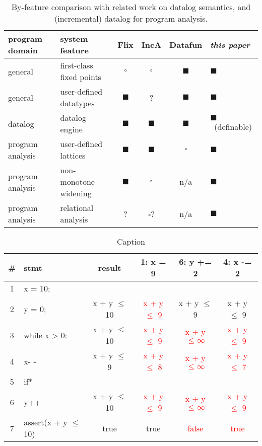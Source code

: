 \documentclass[acmlarge,anonymous]{acmart}\settopmatter{printfolios=true}
\begin{document}
\newcommand{\TabYes}{\ensuremath{\blacksquare}}
\newcommand{\TabNo}{\ensuremath{\square}}

\begin{table}
\begin{tabular}{|p{1.3in}p{1.5in}||ccc|l|}
  \hline
  \textbf{program domain} &
  \textbf{system feature} & Flix & IncA & Datafun & \emph{this paper}
  \\
  \hline
  general &
  first-class  
  fixed points & \TabNo & \TabNo & \TabYes & \TabYes
  \\
  general &
  user-defined
  datatypes & \TabYes & ? & \TabYes & \TabYes
  \\
  \hline
  datalog &
  datalog engine & \TabYes & \TabYes & \TabYes & \TabYes~(definable)
  \\
  \hline
  program analysis &
  user-defined lattices & \TabYes & \TabYes & \TabNo & \TabYes
  \\
  program analysis &
  non-monotone 
  widening
  & \TabYes & \TabNo & n/a & \TabYes
  \\
  program analysis &
  relational 
  analysis
  & ? & \TabNo? & n/a & \TabYes
  \\
  \hline
\end{tabular}
\caption{By-feature comparison with related work on datalog semantics, and (incremental) datalog for program analysis.}
\label{tab:relatedwork}
\end{table}

\begin{table}[]
    \centering
    \begin{tabular}{|c|l|c|c|c|c|}
        \hline
        \# & stmt & result & 1: x = 9 & 6: y += 2 & 4: x -= 2 \\
        \hline
        1 & x = 10; & & & &\\
        \hline
        2 & y = 0; & x + y $\le$ 10 & \textcolor{red}{x + y $\le$ 9} & x + y $\le$ 9 & x + y $\le$ 9\\
        \hline
        3 & while x > 0: & x + y $\le$ 10 & \textcolor{red}{x + y $\le$ 9} & \textcolor{red}{x + y $\le \infty$} & \textcolor{red}{x + y $\le$ 9}\\
        \hline
        4 & \hspace*{0.3cm} x- - & x + y $\le$ 9 & \textcolor{red}{x + y $\le$ 8} & \textcolor{red}{x + y $\le \infty$} & \textcolor{red}{x + y $\le$ 7}\\
        \hline
        5 & \hspace*{0.3cm} if* & & & &\\
        \hline
        6 & \hspace*{0.6cm} y++ & x + y $\le$ 10 & \textcolor{red}{x + y $\le$ 9} & \textcolor{red}{x + y $\le \infty$} & \textcolor{red}{x + y $\le$ 9}\\
        \hline
        7 & assert(x + y $\le$ 10) & true & true & \textcolor{red}{false} & \textcolor{red}{true}\\
        \hline
    \end{tabular}
    \caption{Caption}
    \label{tab:my_label}
\end{table}
\end{document}
